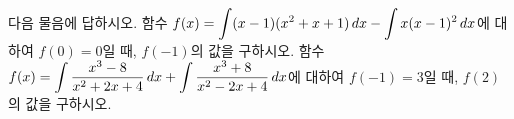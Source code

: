 다음 물음에 답하시오.
 함수 $f(x)=\displaystyle\int (x-1)(x^2+x+1)\mkern3mu dx-\int x(x-1)^2\mkern3mu dx$에 대하여 $f(0)=0$일 때, $f(-1)$의 값을 구하시오.
 함수 $f(x)=\displaystyle\int \dfrac{x^3-8}{x^2+2x+4}\mkern3mu dx+\int \dfrac{x^3+8}{x^2-2x+4}\mkern3mu dx$에 대하여 $f(-1)=3$일 때, $f(2)$의 값을 구하시오.
